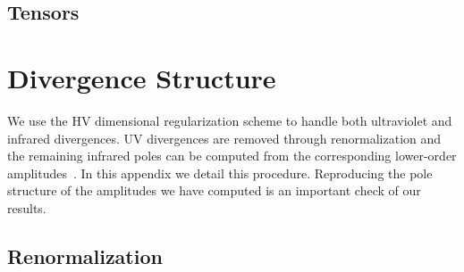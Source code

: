 \subsection{Tensors}


\section{Divergence Structure}
\label{sec:IR}

We use the HV dimensional regularization
scheme to handle both ultraviolet and infrared divergences.
UV divergences are removed through renormalization and the
remaining infrared poles can be computed from the corresponding
lower-order
amplitudes~\cite{Catani:1998bh,Sterman:2002qn,Becher:2009cu,
Gardi:2009qi}. In this appendix we detail this procedure.
Reproducing the pole structure of the amplitudes we have 
computed is an important check of our results.


\subsection{Renormalization}

